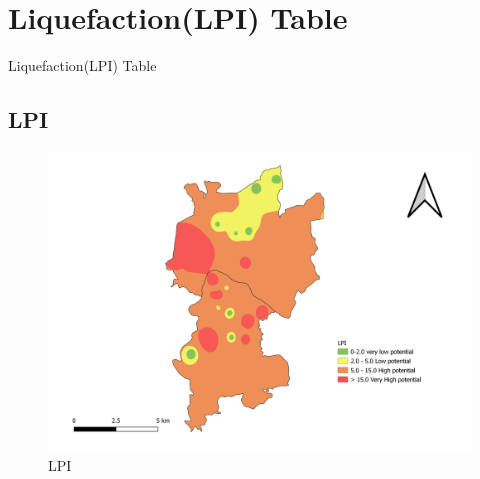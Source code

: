 \section{Liquefaction(LPI) Table}
\begin{table}[!h]
\caption{Liquefaction(LPI) Table}

\end{table}
\pagebreak

\begin{landscape}
\section{LPI}
\begin{figure}[!h]
\centering
\includegraphics[width=0.8\linewidth, height=0.8\textheight,keepaspectratio]{in/map/LPI.png}
\caption{LPI}
\end{figure}
\pagebreak
\end{landscape}